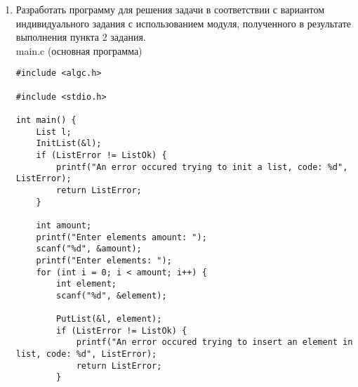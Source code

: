 \documentclass[a4paper,14pt]{extarticle}
\begin{document}
\begin{enumerate}
\begin{verbatim}
void EndPtr(List *L) {
    L->ptr = L->Start;

    while (L->ptr->next != NULL) {
        L->ptr = L->ptr->next;
    }
    ListError = ListOk;
}

void MovePtr(List *L) {
    if (EndList(L)) {
        ListError = ListEnd;
        return;
    }

    L->ptr = L->ptr->next;
    ListError = ListOk;
}

void MoveTo(List *L, unsigned int n) {
    BeginPtr(L);

    for (int i = 0; i < n + 1; i++) {
        if (L->ptr->next == NULL) {
            ListError = ListEnd;
            return;
        }

        MovePtr(L);
    }
    ListError = ListOk;
}

static void freeElement(ptrel element) {
    if (element == NULL)
        return;
    
    freeElement(element->next);
    free(element);
}

void DoneList(List *L) {
    EndPtr(L);
    if (ListError != ListOk)
        return;
    
    freeElement(L->Start);
    L->Start = NULL;
    L->ptr = NULL;
    L->N = 0;
    ListError = ListOk;
}

void CopyList(List *L1,List *L2) {
    do 
    {
        PutList(L2, L1->ptr->data);
        if (EndList(L1)) break;

        MovePtr(L1);
    } while (ListError == ListOk);    
}
\end{verbatim}
\item Разработать программу для решения задачи в соответствии с вариантом 
индивидуального задания  с использованием модуля, полученного 
в результате выполнения пункта 2 задания.\\
main.c (основная программа)
\begin{verbatim}
#include <algc.h>

#include <stdio.h>

int main() {
    List l;
    InitList(&l);
    if (ListError != ListOk) {
        printf("An error occured trying to init a list, code: %d", ListError);
        return ListError;
    }

    int amount;
    printf("Enter elements amount: ");
    scanf("%d", &amount);
    printf("Enter elements: ");
    for (int i = 0; i < amount; i++) {
        int element;
        scanf("%d", &element);

        PutList(&l, element);
        if (ListError != ListOk) {
            printf("An error occured trying to insert an element in list, code: %d", ListError);
            return ListError;
        }
        

\end{verbatim}
\end{enumerate}
\end{document}
